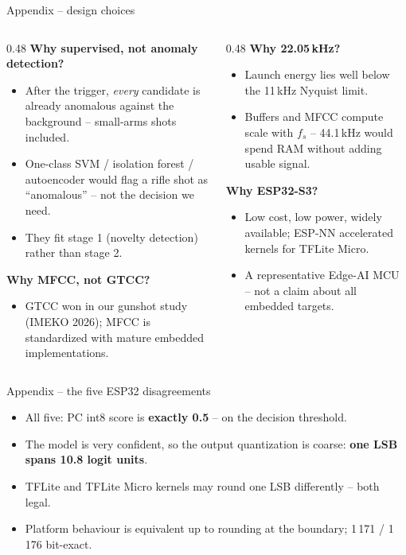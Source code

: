 \documentclass[aspectratio=169,10pt]{beamer}
\begin{document}
\begin{frame}{Appendix -- design choices}
  \begin{columns}[T,onlytextwidth]
    \begin{column}{0.48\textwidth}
      \small\textbf{Why supervised, not anomaly detection?}
      \begin{itemize}\small
        \item After the trigger, \emph{every} candidate is already anomalous against the
              background -- small-arms shots included.
        \item One-class SVM / isolation forest / autoencoder would flag a rifle shot as
              ``anomalous'' -- not the decision we need.
        \item They fit stage 1 (novelty detection) rather than stage 2.
      \end{itemize}
      \small\textbf{Why MFCC, not GTCC?}
      \begin{itemize}\small
        \item GTCC won in our gunshot study (IMEKO 2026); MFCC is standardized with mature
              embedded implementations.
      \end{itemize}
    \end{column}
    \begin{column}{0.48\textwidth}
      \small\textbf{Why 22.05\,kHz?}
      \begin{itemize}\small
        \item Launch energy lies well below the 11\,kHz Nyquist limit.
        \item Buffers and MFCC compute scale with $f_s$ -- 44.1\,kHz would spend RAM
              without adding usable signal.
      \end{itemize}
      \small\textbf{Why ESP32-S3?}
      \begin{itemize}\small
        \item Low cost, low power, widely available; ESP-NN accelerated kernels for
              TFLite Micro.
        \item A representative Edge-AI MCU -- not a claim about all embedded targets.
      \end{itemize}
    \end{column}
  \end{columns}
\end{frame}

\begin{frame}{Appendix -- the five ESP32 disagreements}
  \begin{itemize}
    \item All five: PC int8 score is \textbf{exactly 0.5} -- on the decision threshold.
    \item The model is very confident, so the output quantization is coarse:
          \textbf{one LSB spans 10.8 logit units}.
    \item TFLite and TFLite Micro kernels may round one LSB differently -- both legal.
    \item Platform behaviour is equivalent up to rounding at the boundary;
          1\,171 / 1\,176 bit-exact.
  \end{itemize}
\end{frame}
\end{document}
